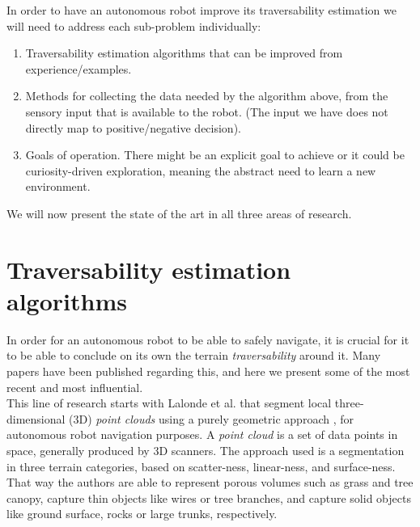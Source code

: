 \documentclass[12pt,a4paper]{report}
\newcommand{\term}{\textit}
\newcommand{\acronym}{\MakeUppercase}
\begin{document}
	In order to have an autonomous robot improve its traversability 
	estimation we will need to address each sub-problem individually:
	
	\begin{enumerate}
		\item Traversability estimation algorithms that can be improved from 
		experience/examples.
		\item Methods for collecting the data needed by the algorithm above, from 
		the sensory input that is available to the robot. (The input we have does not 
		directly map to positive/negative decision).
		\item Goals of operation. There might be an explicit goal to achieve or it 
		could be curiosity-driven exploration, meaning the abstract need to learn a 
		new environment.
	\end{enumerate}
	
	We will now present the state of the art in all three areas of research.
	\\
	
	\section{Traversability estimation algorithms}
	\label{sec:bg:trav}
	
	In order for an autonomous robot to be able to safely navigate, it is crucial 
	for it to be able to conclude on its own the terrain \term{traversability} 
	around it. Many papers have been published regarding this, and here we present 
	some of the most recent and most influential.
	\\
	
	This line of research starts with Lalonde et al. that segment local three-
	dimensional (\acronym{3d}) \term{point clouds} using a purely geometric 
	approach \cite{Lalonde}, for autonomous robot navigation purposes. A 
	\term{point cloud} is a set of data points in space, generally produced by 
	\acronym{3d} scanners. The approach used is a segmentation in three terrain 
	categories, based on scatter-ness, linear-ness, and surface-ness. That way 
	the authors are able to represent porous volumes such as grass and tree canopy, 
	capture thin objects like wires or tree branches, and capture solid objects 
	like ground surface, rocks or large trunks, respectively.
	\\	
	
\end{document}
